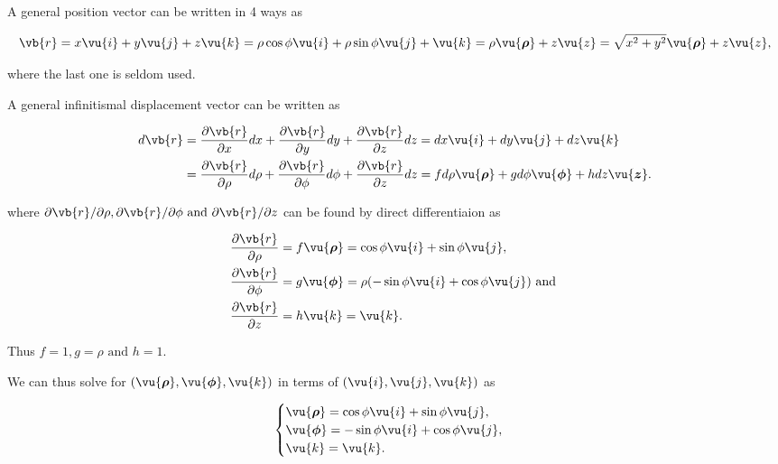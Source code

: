 \documentclass[english,a4paper,12pt]{report}
\begin{document}
A general position vector can be written in 4 ways as

\begin{equation}
    \vb{r} = x \vu{i} + y \vu{j} + z \vu{k} = \rho \cos \phi  \vu{i} + \rho \sin \phi \vu{j} + \vu{k} = \rho \vu{\boldsymbol{\rho } } + z \vu{z} = \sqrt{x^2+y^2}\vu{\boldsymbol{\rho } } + z \vu{z} , 
\end{equation}

where the last one is seldom used.

A general infinitismal displacement vector can be written as 

\begin{equation}
    \begin{aligned}
    d \vb{r} &= \frac{\partial \vb{r} }{\partial x} dx + \frac{\partial \vb{r} }{\partial y} dy + \frac{\partial \vb{r} }{\partial z} dz = dx \vu{i} + dy \vu{j} + dz \vu{k} \\ &= \frac{\partial \vb{r} }{\partial \rho } d\rho  + \frac{\partial \vb{r} }{\partial \phi  }d \phi  + \frac{\partial \vb{r} }{\partial z}d z =f d \rho  \vu{\boldsymbol{\rho } }  +g d\phi \vu{\boldsymbol{\phi  } } +h  d z\vu{\boldsymbol{z} }. 
    \end{aligned}
\end{equation}

where \(\partial \vb{r} / \partial \rho , \partial \vb{r} / \partial \phi  \text { and } \partial \vb{r} /\partial z  \) can be found by direct differentiaion as 

\begin{equation}
	\begin{aligned} 
		\frac{\partial \vb{r} }{\partial \rho }  &= f \vu{\boldsymbol{\rho } } = \cos{\phi}\vu{i} + \sin{\phi}\vu{j}, \\
		\frac{\partial \vb{r} }{\partial \phi }  &= g \vu{\boldsymbol{\phi } } = \rho (-\sin{\phi}\vu{i} + \cos{\phi}\vu{j}) \text { and }  \\
		\frac{\partial \vb{r} }{\partial z }  &= h \vu{k} = \vu{k}. 
	\end{aligned} 
\end{equation}

Thus \(f = 1, g = \rho  \text { and }  h = 1\). 

We can thus solve for \((\vu{\boldsymbol{\rho } }, \vu{\boldsymbol{\phi } }, \vu{k} )\) in terms of \((\vu{i} ,\vu{j} ,\vu{k} )\) as

\begin{equation}
    \begin{cases} 
        \vu{\boldsymbol{\rho } } = \cos \phi \vu{i} + \sin \phi \vu{j}, \\
        \vu{\boldsymbol{\phi } } = -\sin \phi \vu{i} + \cos \phi \vu{j}, \\
        \vu{k} = \vu{k}.
        \end{cases}
\end{equation}
\end{document}
